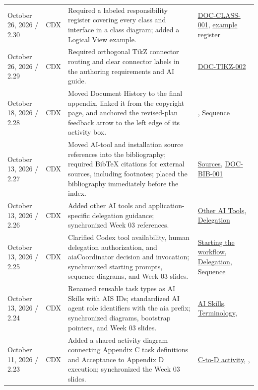 \begin{tabularx}{\linewidth}{L{3.1cm}L{2.2cm}YL{2.5cm}}
October 26, 2026 / 2.30 & CDX & Required a labeled responsibility register covering every class and interface in a class diagram; added a Logical View example. & \hyperref[Requirement:DOCCLASS001]{DOC-CLASS-001}, \hyperref[Table:ExampleClassResponsibilities]{example register}\\
October 26, 2026 / 2.29 & CDX & Required orthogonal TikZ connector routing and clear connector labels in the authoring requirements and AI guide. & \hyperref[Requirement:DOCTIKZ002]{DOC-TIKZ-002}\\
October 18, 2026 / 2.28 & CDX & Moved Document History to the final appendix, linked it from the copyright page, and anchored the revised-plan feedback arrow to the left edge of its activity box. & , \hyperref[Figure:AIImplementationSequence]{Sequence}\\
October 13, 2026 / 2.27 & CDX & Moved AI-tool and installation source references into the bibliography; required BibTeX citations for external sources, including footnotes; placed the bibliography immediately before the index. & \hyperref[Section:DocumentBibliography]{Sources}, \hyperref[Requirement:DOCBIB001]{DOC-BIB-001}\\
October 13, 2026 / 2.26 & CDX & Added other AI tools and application-specific delegation guidance; synchronized Week 03 references. & \hyperref[Section:AIOtherTools]{Other AI Tools}, \hyperref[Section:AIAgentDelegation]{Delegation}\\
October 13, 2026 / 2.25 & CDX & Clarified Codex tool availability, human delegation authorization, and aiaCoordinator decision and invocation; synchronized starting prompts, sequence diagrams, and Week 03 slides. & \hyperref[Section:AIImplementationStart]{Starting the workflow}, \hyperref[Section:AIAgentDelegation]{Delegation}, \hyperref[Figure:AIImplementationSequence]{Sequence}\\
October 13, 2026 / 2.24 & CDX & Renamed reusable task types as AI Skills with AIS IDs; standardized AI agent role identifiers with the aia prefix; synchronized diagrams, bootstrap pointers, and Week 03 slides. & \hyperref[Table:AISkills]{AI Skills}, \hyperref[Rule:AITerminologyConsistency]{Terminology}, \\
October 11, 2026 / 2.23 & CDX & Added a shared activity diagram connecting Appendix C task definitions and Acceptance to Appendix D execution; synchronized the Week 03 slides. & \hyperref[Figure:AITaskExecutionActivity]{C-to-D activity}, , \\

\end{tabularx}
